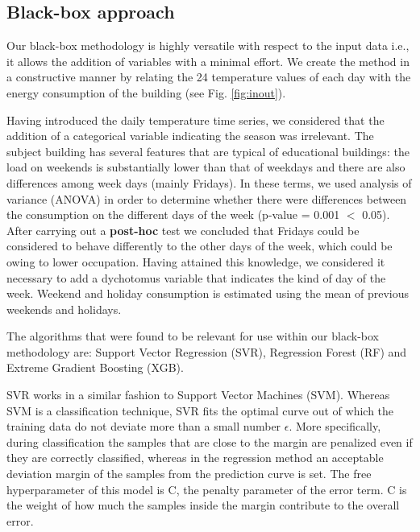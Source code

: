 \documentclass[10pt, conference, compsocconf]{IEEEtran}
\begin{document}
\subsection{Black-box approach}

Our black-box methodology is highly versatile with respect to the input data i.e.,  it allows the addition of variables with a minimal effort. We create the method in a constructive manner by relating the 24 temperature values of each day with the energy consumption of the building (see Fig. \ref{fig:inout}).

Having introduced the daily temperature time series, we considered that the addition of a categorical variable indicating the season was irrelevant. The subject building has several features that are typical of educational buildings: the load %
on weekends is substantially lower than that of weekdays and there are also differences among week days (mainly Fridays).
In these terms, we used analysis of variance (ANOVA) in order to determine whether there were differences between the consumption on the different days of the week (p-value = 0.001 $<$ 0.05). After carrying out a \textbf{post-hoc}  test we concluded that Fridays could be considered to behave differently to the other days of the week, which could be owing to lower occupation. Having attained this knowledge, we considered it necessary to add a dychotomus variable that indicates the kind of day of the week. Weekend and holiday consumption is estimated using the mean of previous weekends and holidays.

The algorithms that were found to be relevant for use within our black-box methodology are: Support Vector Regression (SVR), Regression Forest (RF) and Extreme Gradient Boosting (XGB). 

SVR works in a similar fashion to Support Vector Machines (SVM). Whereas SVM is a classification technique, SVR fits the optimal curve out of which the training data do not deviate more than a small number $\epsilon$. More specifically, during classification the samples that are close to the margin are penalized even if they are correctly classified, whereas in the regression method an acceptable deviation margin of the samples from the prediction curve is set.
The free hyperparameter of this model is C, the penalty parameter of the error term. C is the weight of how much the samples inside the margin contribute to the overall error.%
\end{document}
